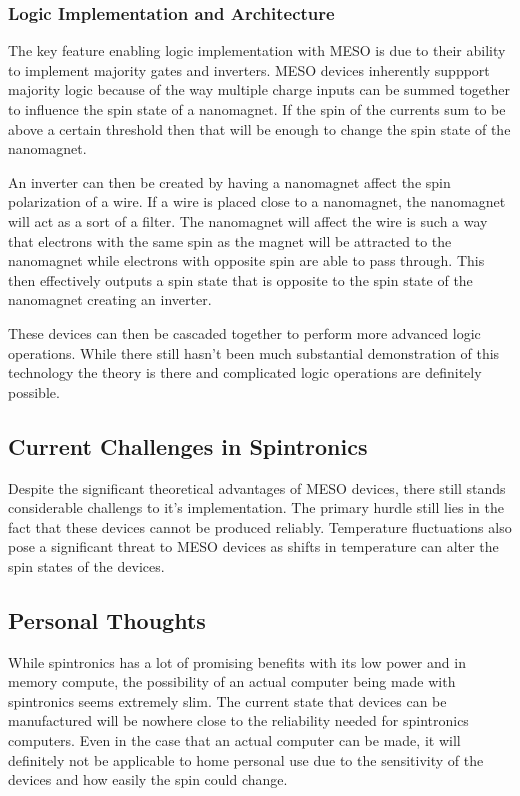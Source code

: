 \documentclass[sigconf]{acmart}
\begin{document}
\subsubsection{Logic Implementation and Architecture}
The key feature enabling logic implementation with MESO is due to 
their ability to implement majority gates and inverters. MESO devices
inherently suppport majority logic because of the way multiple 
charge inputs can be summed together to influence the spin state
of a nanomagnet. If the spin of the currents sum to be above a 
certain threshold then that will be enough to change the spin state
of the nanomagnet. 

An inverter can then be created by having a nanomagnet affect the 
spin polarization of a wire. If a wire is placed close to a nanomagnet, 
the nanomagnet will act as a sort of a filter. The nanomagnet 
will affect the wire is such a way that electrons with the same spin 
as the magnet will be attracted to the nanomagnet while electrons with 
opposite spin are able to pass through. This then effectively 
outputs a spin state that is opposite to the spin state of 
the nanomagnet creating an inverter. 

These devices can then be cascaded together to perform more advanced 
logic operations. While there still hasn't been much 
substantial demonstration of this technology the theory is there 
and complicated logic operations are definitely possible.
\cite{manipatruni2019scalable}

\subsection{Current Challenges in Spintronics}
Despite the significant theoretical advantages of MESO devices, there 
still stands considerable challengs to it's implementation. The primary 
hurdle still lies in the fact that these devices cannot be produced reliably. 
Temperature fluctuations also pose a significant threat to MESO devices
as shifts in temperature can alter the spin states of the devices. 

\subsection{Personal Thoughts}
While spintronics has a lot of promising benefits with its low power 
and in memory compute, the possibility of an actual computer being 
made with spintronics seems extremely slim. The current state 
that devices can be manufactured will be nowhere close to the 
reliability needed for spintronics computers. Even in the case that 
an actual computer can be made, it will definitely not be applicable 
to home personal use due to the sensitivity of the devices and how easily 
the spin could change. 
\end{document}
